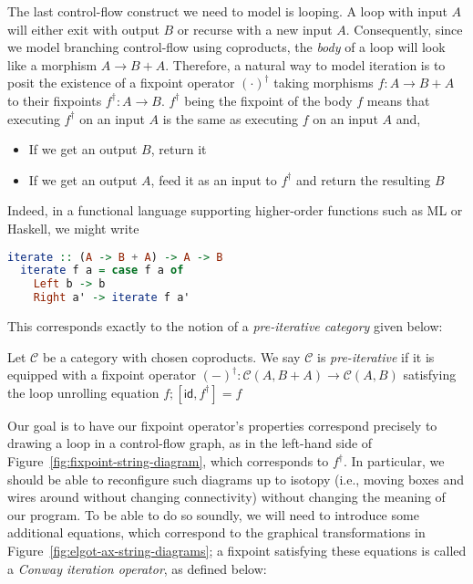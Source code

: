 \documentclass[acmsmall,screen,review]{acmart}
\newcommand{\mc}[1]{\ensuremath{\mathcal{#1}}}
\newcommand{\ms}[1]{\ensuremath{\mathsf{#1}}}
\begin{document}
The last control-flow construct we need to model is looping. A loop with input $A$ will either exit
with output $B$ or recurse with a new input $A$. Consequently, since we model branching control-flow
using coproducts, the \emph{body} of a loop will look like a morphism $A \to B + A$. Therefore, a
natural way to model iteration is to posit the existence of a fixpoint operator $(\cdot)^\dagger$
taking morphisms $f: A \to B + A$ to their fixpoints $f^\dagger: A \to B$. $f^\dagger$ being the
fixpoint of the body $f$ means that executing $f^\dagger$ on an input $A$ is the same as executing
$f$ on an input $A$ and,
\begin{itemize}
  \item If we get an output $B$, return it
  \item If we get an output $A$, feed it as an input to $f^\dagger$ and return the resulting $B$
\end{itemize}
Indeed, in a functional language supporting higher-order functions such as ML or Haskell, we might
write 
\begin{lstlisting}[language=Haskell]
  iterate :: (A -> B + A) -> A -> B
  iterate f a = case f a of
    Left b -> b
    Right a' -> iterate f a'
\end{lstlisting}
This corresponds exactly to the notion of a \emph{pre-iterative category} given below:
\begin{definition}
  Let $\mc{C}$ be a category with chosen coproducts. We say $\mc{C}$ is \emph{pre-iterative} if it
  is equipped with a fixpoint operator $(-)^\dagger : \mc{C}(A, B + A) \to \mc{C}(A, B)$ satisfying the loop unrolling equation
  $f ; [\ms{id}, f^\dagger] = f$
\end{definition}
Our goal is to have our fixpoint operator's properties correspond precisely to drawing a loop in a
control-flow graph, as in the left-hand side of Figure~\ref{fig:fixpoint-string-diagram}, which
corresponds to $f^\dagger$. In particular, we should be able to reconfigure such diagrams up to
isotopy (i.e., moving boxes and wires around without changing connectivity) without changing the
meaning of our program. To be able to do so soundly, we will need to introduce some additional
equations, which correspond to the graphical transformations in
Figure~\ref{fig:elgot-ax-string-diagrams}; a fixpoint satisfying these equations is called a
\emph{Conway iteration operator}, as defined below:
\end{document}
